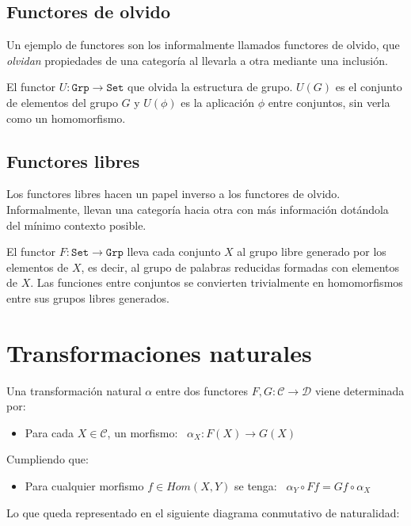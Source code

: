 \documentclass[a4paper, 11pt]{amsart}
\newcommand{\C}{\mathcal{C} }
\theoremstyle{definition}
\theoremstyle{remark}
\numberwithin{equation}{section}
\begin{document}
  
  \subsection {Functores de olvido}
    Un ejemplo de functores son los informalmente llamados functores de olvido,
    que \textit{olvidan} propiedades de una categoría al llevarla a otra mediante
    una inclusión.
    
    \example El functor $U: \mathtt{Grp} \rightarrow \mathtt{Set}$ que olvida la
    estructura de grupo. $U(G)$ es el conjunto de elementos del grupo $G$ y $U(\phi)$
    es la aplicación $\phi$ entre conjuntos, sin verla como un homomorfismo.
    
  \subsection {Functores libres}
    Los functores libres hacen un papel inverso a los functores de olvido.
    Informalmente, llevan una categoría hacia otra con más información dotándola del mínimo
    contexto posible.
    
    \example El functor $F: \mathtt{Set} \rightarrow \mathtt{Grp}$ lleva cada conjunto $X$
    al grupo libre generado por los elementos de $X$, es decir, al grupo de palabras
    reducidas formadas con elementos de $X$. Las funciones entre conjuntos se convierten
    trivialmente en homomorfismos entre sus grupos libres generados.
 
\newpage
\section {Transformaciones naturales}
   Una transformación natural $\alpha$ entre dos functores $F,G: \C \rightarrow \mathcal{D}$
  viene determinada por:
  \begin{itemize}
   \item Para cada $X \in \C$, un morfismo: \, $\alpha_X : F(X) \rightarrow G(X)$
  \end{itemize}
  Cumpliendo que:
  \begin{itemize}
   \item Para cualquier morfismo $f \in Hom(X,Y)$ se tenga: \, $\alpha_Y \circ Ff = Gf \circ \alpha_X$
  \end{itemize}
  Lo que queda representado en el siguiente diagrama conmutativo de naturalidad:
  \begin{center}
  \end{center}
  
\end{document}
